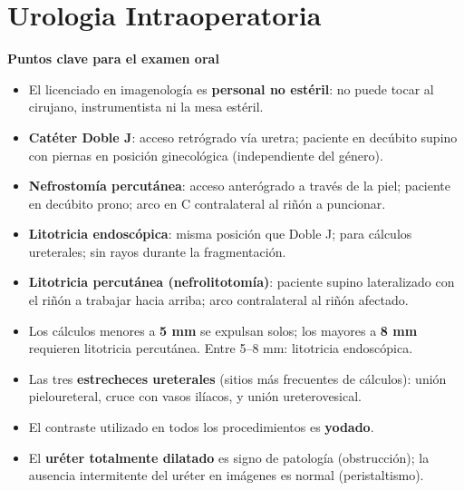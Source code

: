 
\chapter{Urologia Intraoperatoria}


\begin{cajakeypoints}
\textbf{\color{azulprincipal} Puntos clave para el examen oral}
\begin{itemize}[noitemsep, topsep=2pt]
  \item El licenciado en imagenología es \textbf{personal no estéril}: no puede tocar al cirujano, instrumentista ni la mesa estéril.
  \item \textbf{Catéter Doble J}: acceso retrógrado vía uretra; paciente en decúbito supino con piernas en posición ginecológica (independiente del género).
  \item \textbf{Nefrostomía percutánea}: acceso anterógrado a través de la piel; paciente en decúbito prono; arco en C contralateral al riñón a puncionar.
  \item \textbf{Litotricia endoscópica}: misma posición que Doble J; para cálculos ureterales; sin rayos durante la fragmentación.
  \item \textbf{Litotricia percutánea (nefrolitotomía)}: paciente supino lateralizado con el riñón a trabajar hacia arriba; arco contralateral al riñón afectado.
  \item Los cálculos menores a \textbf{5 mm} se expulsan solos; los mayores a \textbf{8 mm} requieren litotricia percutánea. Entre 5--8 mm: litotricia endoscópica.
  \item Las tres \textbf{estrecheces ureterales} (sitios más frecuentes de cálculos): unión pieloureteral, cruce con vasos ilíacos, y unión ureterovesical.
  \item El contraste utilizado en todos los procedimientos es \textbf{yodado}.
  \item El \textbf{uréter totalmente dilatado} es signo de patología (obstrucción); la ausencia intermitente del uréter en imágenes es normal (peristaltismo).
\end{itemize}
\end{cajakeypoints}

